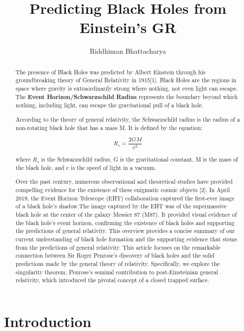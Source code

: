\documentclass{article}
\title{ \Huge \textbf{Predicting Black Holes from Einstein's GR}}
\author{\large Riddhiman Bhattacharya}
\begin{document}
\maketitle



\begin{abstract}

\large

The presence of Black Holes was predicted by Albert Einstein through his groundbreaking theory of General Relativity in 1915[1]. Black Holes 
are the regions in space where gravity is extraordinarily strong where nothing, not even light can escape. 
The \textbf{Event Horizon/Schwarzschild Radius} represents the boundary beyond which nothing, including light, can escape the gravitational pull of a black hole.

According to the theory of general relativity, the Schwarzschild radius is the radius of a non-rotating black hole that has a mass M. It is defined by the equation:

$$R_s = \frac{2GM}{c^2}$$

where $R_s$ is the Schwarzschild radius, G is the gravitational constant, M is the mass of the black hole, and c is the speed of light in a vacuum.


Over the past century, numerous observational and theoretical studies have provided compelling evidence for the existence of these enigmatic cosmic objects [2]. In April 2019,  the Event Horizon Telescope (EHT) collaboration captured the first-ever image of a black hole's shadow.The image captured by the EHT was of the supermassive black hole at the center of the galaxy Messier 87 (M87). It provided visual evidence of the black hole's event horizon, confirming the existence of black holes and supporting the predictions of general relativity.
This overview provides a concise summary of our current understanding of black hole formation and the supporting evidence that stems from the predictions of general relativity. 
This article focuses on the remarkable connection between Sir Roger Penrose's discovery of black holes and the solid predictions made by the general theory of relativity. Specifically, we explore the singularity theorem, Penrose's seminal contribution to post-Einsteinian general relativity, which introduced the pivotal concept of a closed trapped surface.


\end{abstract}

\section{\Large Introduction}
\end{document}
